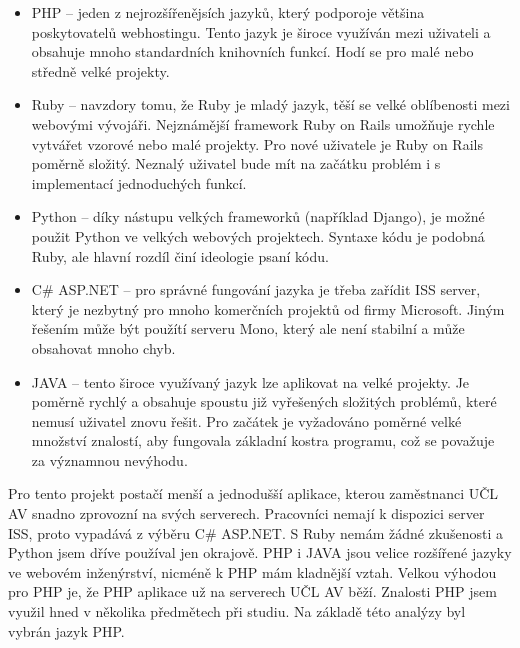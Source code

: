             \begin{itemize}
                \item PHP – jeden z nejrozšířenějsích jazyků, který podporoje většina poskytovatelů webhostingu. Tento jazyk je široce využíván mezi uživateli a obsahuje mnoho standardních knihovních funkcí. Hodí se pro malé nebo středně velké projekty.
                
                \item Ruby – navzdory tomu, že Ruby je mladý jazyk, těší se velké oblíbenosti mezi webovými vývojáři. Nejznámější framework Ruby on Rails umožňuje rychle vytvářet vzorové nebo malé projekty. Pro nové uživatele je Ruby on Rails poměrně složitý. Neznalý uživatel bude mít na začátku problém i s implementací jednoduchých funkcí.
                
                \item Python – díky nástupu velkých frameworků (například Django), je možné použit Python ve velkých webových projektech. Syntaxe kódu je podobná Ruby, ale hlavní rozdíl činí ideologie psaní kódu.
                
                \item C\# ASP.NET – pro správné fungování jazyka je třeba zařídit ISS server, který je nezbytný pro mnoho komerčních projektů od firmy Microsoft. Jiným řešením může být použítí serveru Mono, který ale není stabilní a může obsahovat mnoho chyb.
                
                \item JAVA – tento široce využívaný jazyk lze aplikovat na velké projekty. Je poměrně rychlý a obsahuje spoustu již vyřešených složitých problémů, které nemusí uživatel znovu řešit. Pro začátek je vyžadováno poměrné velké množství znalostí, aby fungovala základní kostra programu, což se považuje za významnou nevýhodu.
            \end{itemize}

            Pro tento projekt postačí menší a jednodušší aplikace, kterou zaměstnanci UČL AV snadno zprovozní na svých serverech. Pracovníci nemají k dispozici server ISS, proto vypadává z výběru C\# ASP.NET. S Ruby nemám žádné zkušenosti a Python jsem dříve používal jen okrajově. PHP i JAVA jsou velice rozšířené jazyky ve webovém inženýrství, nicméně k PHP mám kladnější vztah. Velkou výhodou pro PHP je, že PHP aplikace už na serverech UČL AV běží. Znalosti PHP jsem využil hned v několika předmětech při studiu. Na základě této analýzy byl vybrán jazyk PHP.
            
